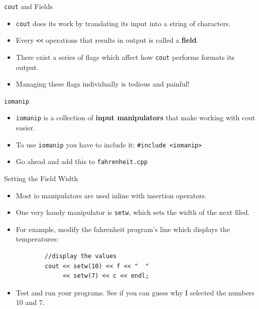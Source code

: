 \documentclass[xcolor=table]{beamer}
\begin{document}
\begin{frame}{\texttt{cout} and Fields}
  \begin{itemize}[<+->]
      \item \texttt{cout} does its work by translating its input into a string of characters.
      \item Every \texttt{<<} operations that results in output is called a \textbf{field}.
      \item There exist a series of flags which affect how \texttt{cout} performs formats its output.
      \item Managing these flags individually is tedious and painful!
  \end{itemize}
\end{frame}

\begin{frame}{\texttt{iomanip}}
  \begin{itemize}[<+->]
    \item \texttt{iomanip} is a collection of \textbf{input manipulators} that make working with cout easier.
    \item To use \texttt{iomanip} you have to include it:
      \newline\texttt{\#include <iomanip>}
    \item Go ahead and add this to \texttt{fahrenheit.cpp}
  \end{itemize}
\end{frame}

\begin{frame}[fragile]{Setting the Field Width}
  \begin{itemize}[<+->]
    \item Most io manipulators are used inline with insertion operators.
    \item One very handy manipulator is \texttt{setw}, which sets the width of the next filed.
    \item For example, modify the fahrenheit program's line which displays the temperatures:
    \begin{BVerbatim}
        //display the values
        cout << setw(10) << f << "  " 
             << setw(7) << c << endl;
    \end{BVerbatim}
    \item Test and run your programs.  See if you can guess why I selected the numbers 10 and 7.
  \end{itemize}
\end{frame}
\end{document}
